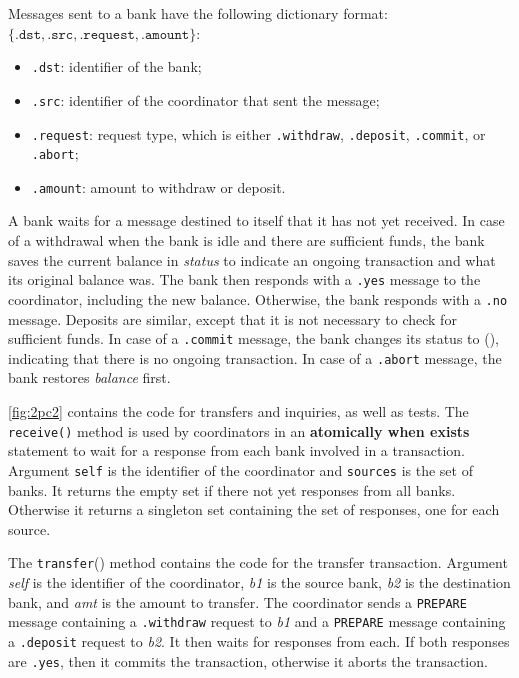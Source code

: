 \documentclass{report}
\begin{document}
{\noindent
Messages sent to a bank have the following dictionary format:
$\{ \mathtt{.dst}, \mathtt{.src}, \mathtt{.request}, \mathtt{.amount} \}$:
\begin{itemize}
\item \texttt{.dst}: identifier of the bank;
\item \texttt{.src}: identifier of the coordinator that sent the message;
\item \texttt{.request}: request type, which is either
\texttt{.withdraw}, \texttt{.deposit}, \texttt{.commit}, or \texttt{.abort};
\item \texttt{.amount}: amount to withdraw or deposit.
\end{itemize}

\noindent
A bank waits for a message destined to itself that it has not yet received.
In case of a withdrawal when the bank is idle and there are sufficient
funds, the bank saves the current balance in \textit{status} to indicate
an ongoing transaction and what its original balance was.
The bank then responds with a \texttt{.yes} message to the coordinator,
including the new balance.
Otherwise, the bank responds with a \texttt{.no} message.
Deposits are similar, except that it is not necessary to check for
sufficient funds.
In case of a \texttt{.commit} message, the bank changes its status
to (), indicating that there is no ongoing transaction.  In case of
a \texttt{.abort} message, the bank restores \textit{balance} first.

\autoref{fig:2pc2} contains the code for transfers and inquiries, as well
as tests.
The \texttt{receive()} method is used by coordinators in an
\textbf{atomically when exists}
statement to wait for a response from each bank involved in a transaction.
Argument \texttt{self} is the
identifier of the coordinator and \texttt{sources} is the set of banks.
It returns the empty set if there not yet responses from all banks.
Otherwise it returns a singleton set containing the set of responses,
one for each source.

The \texttt{transfer}() method contains the code for the transfer
transaction.  Argument \textit{self} is the identifier of the coordinator,
\textit{b1} is the source bank, \textit{b2} is the destination bank,
and \textit{amt} is the amount to transfer.
The coordinator sends a \texttt{PREPARE} message containing a
\texttt{.withdraw} request to \textit{b1} and a \texttt{PREPARE}
message containing a \texttt{.deposit} request to \textit{b2}.
It then waits for responses from each.  If both responses are
\texttt{.yes}, then it commits the transaction, otherwise it aborts
the transaction.

}
\end{document}
